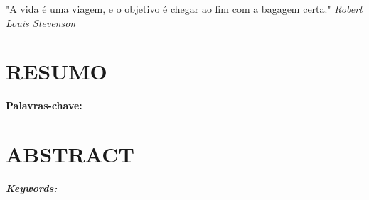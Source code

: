 \documentclass[12pt, a4paper]{article}
\begin{document}
        \null\vfil
        \begin{changemargin}{5cm}{0cm} 
            \justifying
            \hspace{1.5cm} "A vida é uma viagem, e o objetivo é chegar ao fim com a bagagem certa." \textit{Robert Louis Stevenson}
        \end{changemargin}
        \pagebreak

        \section*{\fontsize{12}{14} \selectfont RESUMO}
        

        \vspace{1cm}

        \noindent \textbf{Palavras-chave:} 

        \pagebreak

        \section*{\fontsize{12}{14} \selectfont \center ABSTRACT}
        \textit{}

        \vspace{1cm}
        \noindent \textit{\textbf{Keywords:} }
        \pagebreak
    
        {%
        \let\oldnumberline\numberline%
        \renewcommand{\numberline}{\figurename~\oldnumberline}%
        \listoffigures%
        }
        \thispagestyle{empty} %
        \pagebreak

        {%
        \let\oldnumberline\numberline%
        \renewcommand{\numberline}{Quadro~\oldnumberline}%
        }
        \pagebreak

        {%
        \let\oldnumberline\numberline%
        \renewcommand{\numberline}{\tablename~\oldnumberline}%
        \listoftables%
        }
        \thispagestyle{empty} %
        \pagebreak

        \pagebreak

        \pagebreak

        \doublespacing
        \tableofcontents
        \onehalfspacing
        \thispagestyle{empty} %
        \pagebreak
\end{document}
